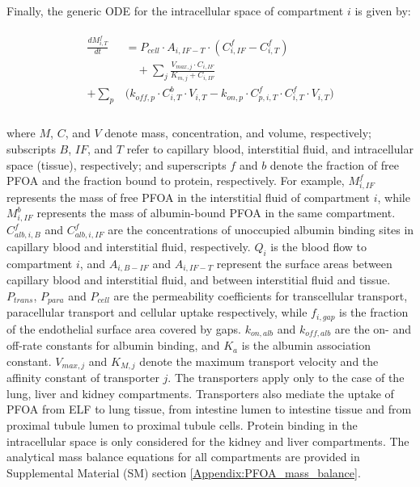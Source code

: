 \documentclass[preprint,12pt,authoryear]{elsarticle}
\begin{document}
Finally, the generic ODE for the intracellular space of compartment $i$ is given by:

\begin{align}
\begin{aligned}
\frac{dM_{i,T}^f}{dt} &=  P_{cell} \cdot A_{i,IF-T} \cdot (C_{i,IF}^f - C_{i,T}^f) \\
&  \quad + \sum_j \frac{V_{max,j} \cdot C_{i,IF}}{K_{m,j}+ C_{i,IF}}  \\
+ \sum_p &  \big(k_{off,p} \cdot C_{i,T}^b \cdot V_{i,T} - k_{on,p} \cdot C_{p,i,T}^f \cdot C_{i,T}^f \cdot V_{i,T} \big)\\
\end{aligned}
\label{eq:PFOA_tissue_ODE_main}
\end{align}

where $M$, $C$, and $V$ denote mass, concentration, and volume, respectively; subscripts $B$, $IF$, and $T$ refer to capillary blood, interstitial fluid, and intracellular space (tissue), respectively; and superscripts $f$ and $b$ denote the fraction of free PFOA and the fraction bound to protein, respectively. For example, $M_{i,IF}^f$ represents the mass of free PFOA in the interstitial fluid of compartment $i$, while $M_{i,IF}^b$ represents the mass of albumin-bound PFOA in the same compartment. $C_{alb,i,B}^f$ and $C_{alb,i,IF}^f$ are the concentrations of unoccupied albumin binding sites in capillary blood and interstitial fluid, respectively. $Q_i$ is the blood flow to compartment $i$, and $A_{i,B-IF}$ and $A_{i,IF-T}$ represent the surface areas between capillary blood and interstitial fluid, and between interstitial fluid and tissue. $P_{trans}$, $P_{para}$ and $P_{cell}$ are the permeability coefficients for transcellular transport, paracellular transport and cellular uptake respectively, while $f_{i,gap}$ is the fraction of the endothelial surface area covered by gaps. $k_{on,alb}$ and $k_{off,alb}$ are the on- and off-rate constants for albumin binding, and $K_a$ is the albumin association constant. $V_{max,j}$ and $K_{M,j}$ denote the maximum transport velocity and the affinity constant of transporter $j$. The transporters apply only to the case of the lung, liver and kidney compartments. Transporters also mediate the uptake of PFOA from ELF to lung tissue, from intestine lumen to intestine tissue and from proximal tubule lumen to proximal tubule cells. Protein binding in the intracellular space is only considered for the kidney and liver compartments. The analytical mass balance equations for all compartments are provided in Supplemental Material (SM) section \ref{Appendix:PFOA_mass_balance}.
\end{document}

